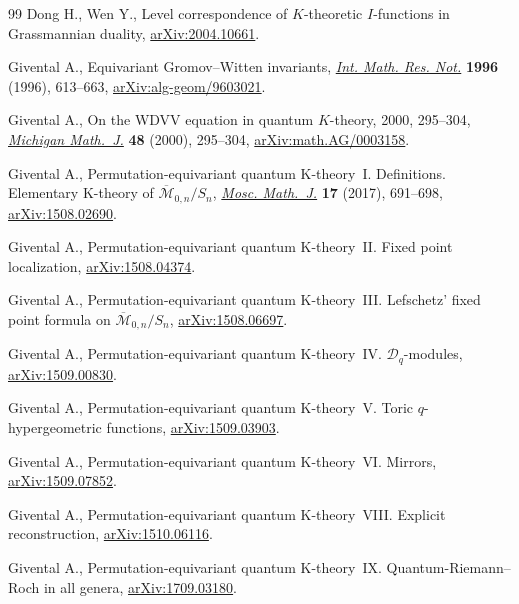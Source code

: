 \documentclass[pdftex]{sigma}
\numberwithin{equation}{section}
\begin{document}
\begin{thebibliography}{99}
Dong H., Wen Y., Level correspondence of {$K$}-theoretic {$I$}-functions in
 {G}rassmannian duality, \href{https://arxiv.org/abs/2004.10661}{arXiv:2004.10661}.

Givental A., Equivariant {G}romov--{W}itten invariants, \href{https://doi.org/10.1155/S1073792896000414}{\textit{Int. Math. Res.
 Not.}} \textbf{1996} (1996), 613--663, \href{https://arxiv.org/abs/alg-geom/9603021}{arXiv:alg-geom/9603021}.

Givental A., On the {WDVV} equation in quantum {$K$}-theory, 2000, 295--304, \href{https://doi.org/10.1307/mmj/1030132720}{\textit{Michigan Math.~J.}} \textbf{48} (2000), 295--304, \href{https://arxiv.org/abs/math.AG/0003158}{arXiv:math.AG/0003158}.

Givental A., Permutation-equivariant quantum {K}-theory~{I}. {D}efinitions.
 {E}lementary {K}-theory of {$\overline{\mathcal M}_{0,n}/S_n$}, \href{https://doi.org/10.17323/1609-4514-2016-16-4-691-698}{\textit{Mosc.
 Math.~J.}} \textbf{17} (2017), 691--698, \href{https://arxiv.org/abs/1508.02690}{arXiv:1508.02690}.

Givental A., Permutation-equivariant quantum {K}-theory~{II}. Fixed point
 localization, \href{https://arxiv.org/abs/1508.04374}{arXiv:1508.04374}.

Givental A., Permutation-equivariant quantum {K}-theory~{III}. {L}efschetz'
 fixed point formula on {${\overline{\mathcal M}}_{0,n}/S_n$},
 \href{https://arxiv.org/abs/1508.06697}{arXiv:1508.06697}.

Givental A., Permutation-equivariant quantum {K}-theory~{IV}. {${\mathcal
 D}_q$}-modules, \href{https://arxiv.org/abs/1509.00830}{arXiv:1509.00830}.

Givental A., Permutation-equivariant quantum {K}-theory~{V}. {T}oric
 {$q$}-hypergeometric functions, \href{https://arxiv.org/abs/1509.03903}{arXiv:1509.03903}.

Givental A., Permutation-equivariant quantum {K}-theory~{VI}. {M}irrors,
 \href{https://arxiv.org/abs/1509.07852}{arXiv:1509.07852}.

Givental A., Permutation-equivariant quantum {K}-theory~{VIII}. {E}xplicit
 reconstruction, \href{https://arxiv.org/abs/1510.06116}{arXiv:1510.06116}.

Givental A., Permutation-equivariant quantum {K}-theory~{IX}.
 {Q}uantum-{R}iemann--{R}och in all genera, \href{https://arxiv.org/abs/1709.03180}{arXiv:1709.03180}.


\end{thebibliography}
\end{document}
